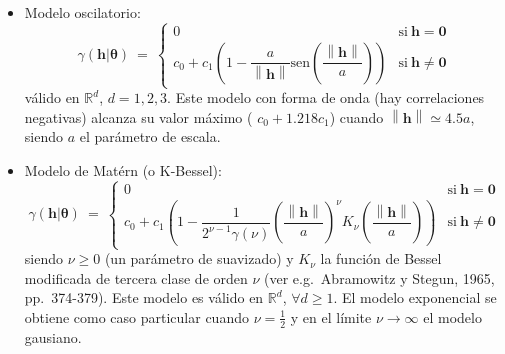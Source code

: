 \documentclass[
  spanish,
]{book}
\theoremstyle{break}
\theoremstyle{definition}
\theoremstyle{definition}
\theoremstyle{definition}
\theoremstyle{definition}
\theoremstyle{remark}
\begin{document}
\begin{itemize}
\[\begin{array}{ll}
  0 & \text{si}\  \mathbf{h}=\mathbf{0} \\
  c_0 + c_1 \left( 1-\exp \left( -3\left( \dfrac{\left\|
  \mathbf{h}\right\| }{a} \right)^{\lambda } \right) \right)  & \text{si}\ 
  \mathbf{h}\neq \mathbf{0}
  \end{array}
  \right.\]
  con \(0\leq \lambda \leq 2\) y válido en \(\mathbb{R}^{d}\), \(\forall d \geq 1\).
  Cuando \(\lambda =2\) es denominado modelo gausiano;
  este modelo sin embargo no debería ser utilizado en la predicción
  espacial debido a las inestabilidades numéricas que produce en los
  algoritmos kriging (especialmente cuando el efecto nugget es grande; ver
  e.g.~Wackernagel, 1998, pp.~120-123).
  El modelo exponencial se obtiene también como caso particular cuando \(\lambda =1\).
\item
  Modelo oscilatorio:
  \[\gamma(\mathbf{h}\left| \boldsymbol{\theta}\right. )\ =\ \left\{ 
  \begin{array}{ll}
  0 & \text{si}\  \mathbf{h}=\mathbf{0} \\
  c_0 + c_1 \left( 1-\dfrac{a}{\left\| \mathbf{h}\right\| }
  \text{sen} \left( \dfrac{\left\| \mathbf{h}\right\| }{a} \right) \right) 
  & \text{si}\  \mathbf{h}\neq \mathbf{0}
  \end{array}
  \right.\]
  válido en \(\mathbb{R}^{d}\), \(d=1,2,3\).
  Este modelo con forma de onda (hay correlaciones negativas) alcanza su valor máximo ( \(c_0 +1.218c_1\)) cuando \(\left\| \mathbf{h}\right\| \simeq 4.5a\), siendo \(a\) el parámetro de escala.
\item
  Modelo de Matérn (o K-Bessel):
  \[\gamma(\mathbf{h}\left| \boldsymbol{\theta}\right. )\ =\ \left\{ 
  \begin{array}{ll}
  0 & \text{si}\  \mathbf{h}=\mathbf{0} \\
  c_0 + c_1 \left( 1-\dfrac{1}{2^{\nu -1} \gamma(\nu )} \left(
  \dfrac{\left\| \mathbf{h}\right\| }{a} \right)^{\nu } K_{\nu } \left(
  \dfrac{\left\| \mathbf{h}\right\| }{a} \right) \right)  & \text{si}\ 
  \mathbf{h}\neq \mathbf{0}
  \end{array}
  \right.\]
  siendo \(\nu \geq 0\) (un parámetro de suavizado) y \(K_{\nu }\) la función de Bessel modificada de tercera clase de orden \(\nu\) (ver e.g.~Abramowitz y Stegun, 1965, pp.~374-379).
  Este modelo es válido en \(\mathbb{R}^{d}\), \(\forall d \geq 1\). El modelo exponencial se obtiene como caso particular cuando \(\nu =\frac{1}{2}\) y en el límite \(\nu \rightarrow \infty\) el modelo gausiano.
\end{itemize}
\end{document}
